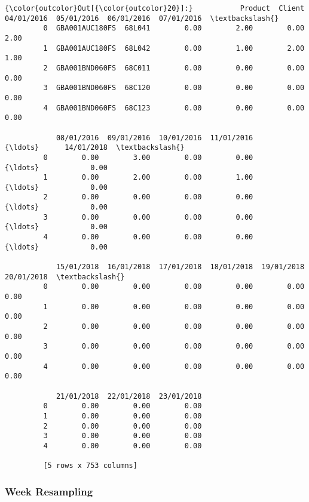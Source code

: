 \documentclass[11pt]{article}
\begin{document}
\begin{Verbatim}[commandchars=\\\{\}]
{\color{outcolor}Out[{\color{outcolor}20}]:}           Product  Client  04/01/2016  05/01/2016  06/01/2016  07/01/2016  \textbackslash{}
         0  GBA001AUC180FS  68L041        0.00        2.00        0.00        2.00   
         1  GBA001AUC180FS  68L042        0.00        1.00        2.00        1.00   
         2  GBA001BND060FS  68C011        0.00        0.00        0.00        0.00   
         3  GBA001BND060FS  68C120        0.00        0.00        0.00        0.00   
         4  GBA001BND060FS  68C123        0.00        0.00        0.00        0.00   
         
            08/01/2016  09/01/2016  10/01/2016  11/01/2016     {\ldots}      14/01/2018  \textbackslash{}
         0        0.00        3.00        0.00        0.00     {\ldots}            0.00   
         1        0.00        2.00        0.00        1.00     {\ldots}            0.00   
         2        0.00        0.00        0.00        0.00     {\ldots}            0.00   
         3        0.00        0.00        0.00        0.00     {\ldots}            0.00   
         4        0.00        0.00        0.00        0.00     {\ldots}            0.00   
         
            15/01/2018  16/01/2018  17/01/2018  18/01/2018  19/01/2018  20/01/2018  \textbackslash{}
         0        0.00        0.00        0.00        0.00        0.00        0.00   
         1        0.00        0.00        0.00        0.00        0.00        0.00   
         2        0.00        0.00        0.00        0.00        0.00        0.00   
         3        0.00        0.00        0.00        0.00        0.00        0.00   
         4        0.00        0.00        0.00        0.00        0.00        0.00   
         
            21/01/2018  22/01/2018  23/01/2018  
         0        0.00        0.00        0.00  
         1        0.00        0.00        0.00  
         2        0.00        0.00        0.00  
         3        0.00        0.00        0.00  
         4        0.00        0.00        0.00  
         
         [5 rows x 753 columns]
\end{Verbatim}
            
    \subsubsection{Week Resampling}\label{week-resampling}
\end{document}
